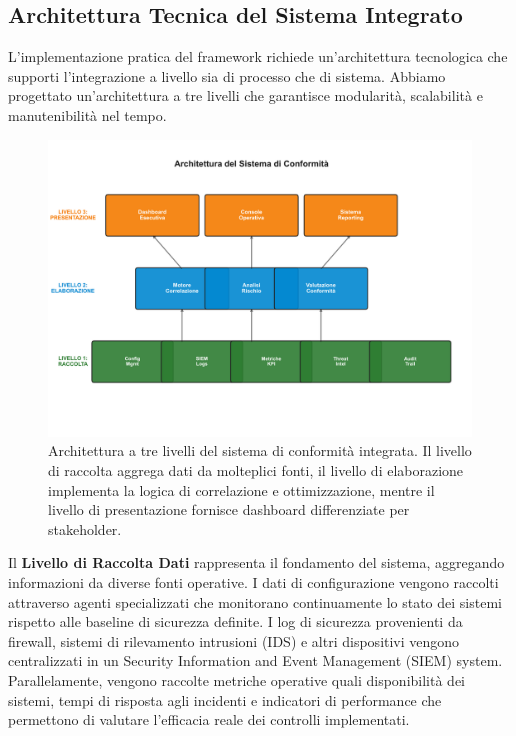 \subsection{\texorpdfstring{Architettura Tecnica del Sistema Integrato}{4.3.2 - Architettura Tecnica del Sistema Integrato}}
\label{subsec:4.3.2_architettura}

L'implementazione pratica del framework richiede un'architettura tecnologica che supporti l'integrazione a livello sia di processo che di sistema. Abbiamo progettato un'architettura a tre livelli che garantisce modularità, scalabilità e manutenibilità nel tempo.

\begin{figure}[h]
\centering
\includegraphics[width=\textwidth]{thesis_figures/cap4/figura_4_2_architettura_LARGE.pdf}
\caption{Architettura a tre livelli del sistema di conformità integrata. Il livello di raccolta aggrega dati da molteplici fonti, il livello di elaborazione implementa la logica di correlazione e ottimizzazione, mentre il livello di presentazione fornisce dashboard differenziate per stakeholder.}
\label{fig:architettura}
\end{figure}

Il \textbf{Livello di Raccolta Dati} rappresenta il fondamento del sistema, aggregando informazioni da diverse fonti operative. I dati di configurazione vengono raccolti attraverso agenti specializzati che monitorano continuamente lo stato dei sistemi rispetto alle baseline di sicurezza definite. I log di sicurezza provenienti da firewall, sistemi di rilevamento intrusioni (IDS) e altri dispositivi vengono centralizzati in un Security Information and Event Management (SIEM) system. Parallelamente, vengono raccolte metriche operative quali disponibilità dei sistemi, tempi di risposta agli incidenti e indicatori di performance che permettono di valutare l'efficacia reale dei controlli implementati.

